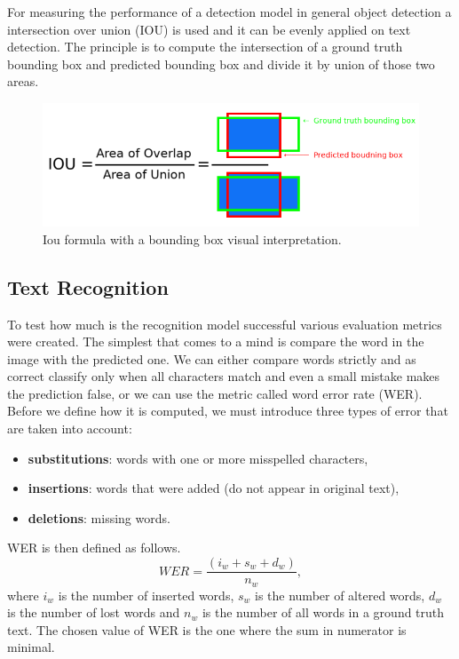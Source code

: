 For measuring the performance of a detection model in general object detection a intersection over union (IOU) is used and it can be evenly applied on text detection. The principle is to compute the intersection of a ground truth bounding box and predicted bounding box and divide it by union of those two areas.\cite{pyimage_iou}

\begin{figure}[hbtp]
    \centering
    \includegraphics[scale=0.4]{obrazky/iou_equation.png}
    \caption{Iou formula with a bounding box visual interpretation.}
    \label{Im:iou}
\end{figure}

\subsection*{Text Recognition}
To test how much is the recognition model successful various evaluation metrics were created. The simplest that comes to a mind is compare the word in the image with the predicted one. We can either compare words strictly and as correct classify only when all characters match and even a small mistake makes the prediction false, or we can use  the metric called word error rate (WER). Before we define how it is computed, we must introduce three types of error that are taken into account:
\begin{itemize}
    \item \textbf{substitutions}: words with one or more misspelled characters,
    \item \textbf{insertions}: words that were added (do not appear in original text),
    \item \textbf{deletions}: missing words.
\end{itemize}

WER is then defined as follows.
\begin{equation}
    WER = \frac{(i_w + s_w + d_w)}{n_w},
\end{equation}
where $i_w$ is the number of inserted words, $s_w$ is the number of altered words, $d_w$ is the number of lost words and $n_w$ is the number of all words in a ground truth text. The chosen value of WER is the one where the sum in numerator is minimal.\cite{cersite}


